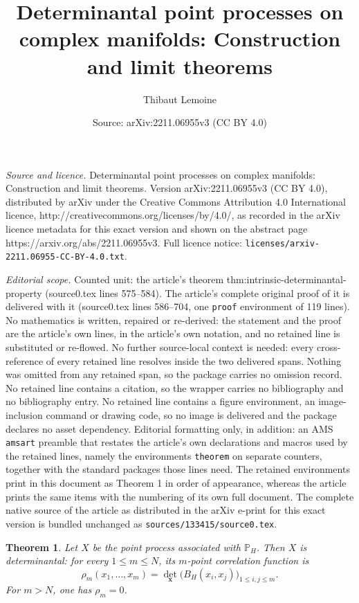 \documentclass[10pt,a4paper]{amsart}
\title{Determinantal point processes on complex manifolds: Construction and limit theorems}
\author{Thibaut Lemoine}
\date{Source: arXiv:2211.06955v3 (CC BY 4.0)}
\newtheorem{theorem}{Theorem}
\def\leq{\leqslant}
\begin{document}
\maketitle

\noindent\emph{Source and licence.} Determinantal point processes on complex manifolds: Construction and limit theorems. Version arXiv:2211.06955v3 (CC BY 4.0), distributed by arXiv under the Creative Commons Attribution 4.0 International licence, http://creativecommons.org/licenses/by/4.0/, as recorded in the arXiv licence metadata for this exact version and shown on the abstract page https://arxiv.org/abs/2211.06955v3. Full licence notice: \texttt{licenses/arxiv-2211.06955-CC-BY-4.0.txt}.\par\smallskip

\noindent\textit{Editorial scope.} Counted unit: the article's theorem thm:intrinsic-determinantal-property (source0.tex lines 575--584). The article's complete original proof of it is delivered with it (source0.tex lines 586--704, one \texttt{proof} environment of 119 lines). No mathematics is written, repaired or re-derived: the statement and the proof are the article's own lines, in the article's own notation, and no retained line is substituted or re-flowed.  No further source-local context is needed: every cross-reference of every retained line resolves inside the two delivered spans.  Nothing was omitted from any retained span, so the package carries no omission record.  No retained line contains a citation, so the wrapper carries no bibliography and no bibliography entry.  No retained line contains a figure environment, an image-inclusion command or drawing code, so no image is delivered and the package declares no asset dependency.  Editorial formatting only, in addition: an AMS \texttt{amsart} preamble that restates the article's own declarations and macros used by the retained lines, namely the environments \texttt{theorem} on separate counters, together with the standard packages those lines need.  The retained environments print in this document as Theorem 1 in order of appearance, whereas the article prints the same items with the numbering of its own full document.  The complete native source of the article as distributed in the arXiv e-print for this exact version is bundled unchanged as \texttt{sources/133415/source0.tex}.
\begin{theorem}\label{thm:intrinsic-determinantal-property}
Let $X$ be the point process associated with $\mathbb P_H$. Then $X$ is determinantal: for every $1\leq m\leq N$, its $m$-point correlation function is
\[
    \rho_m(x_1,\ldots,x_m)
    =
    \det_{\mathbf x}
    \big(B_H(x_i,x_j)\big)_{1\leq i,j\leq m}.
\]
For $m>N$, one has $\rho_m=0$.
\end{theorem}
\end{document}
